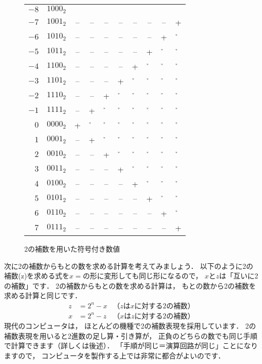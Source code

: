\begin{figure}[tb]
\begin{center}
{\small\tabcolsep=2mm\begin{tabular}{ r l c c c c c c c c }
$-8$  & $1000_2$ &  &  &  &  &  &  &  &  \\
$-7$  & $1001_2$ &--&--&--&--&--&--&--&+ \\
$-6$  & $1010_2$ &--&--&--&--&--&--&+ &\h\\
$-5$  & $1011_2$ &--&--&--&--&--&+ &\h&\h\\
$-4$  & $1100_2$ &--&--&--&--&+ &\h&\h&\h\\
$-3$  & $1101_2$ &--&--&--&+ &\h&\h&\h&\h\\
$-2$  & $1110_2$ &--&--&+ &\h&\h&\h&\h&\h\\
$-1$  & $1111_2$ &--&+ &\h&\h&\h&\h&\h&\h\\
$ 0$  & $0000_2$ &+ &\h&\h&\h&\h&\h&\h&\h\\
$ 1$  & $0001_2$ &--&+ &\h&\h&\h&\h&\h&\h\\
$ 2$  & $0010_2$ &--&--&+ &\h&\h&\h&\h&\h\\
$ 3$  & $0011_2$ &--&--&--&+ &\h&\h&\h&\h\\
$ 4$  & $0100_2$ &--&--&--&--&+ &\h&\h&\h\\
$ 5$  & $0101_2$ &--&--&--&--&--&+ &\h&\h\\
$ 6$  & $0110_2$ &--&--&--&--&--&--&+ &\h\\
$ 7$  & $0111_2$ &--&--&--&--&--&--&--&+ \\
\end{tabular}}
\caption{2の補数を用いた符号付き数値}
\label{fig:chap2:2sc}
\end{center}
\end{figure}

次に2の補数からもとの数を求める計算を考えてみましょう．
以下のように2の補数(z)を求める式を$x=$の形に変形しても同じ形になるので，
$x$と$z$は「互いに2の補数」です．
2の補数からもとの数を求める計算は，
もとの数から2の補数を求める計算と同じです．
{\small\begin{align*}
z &= 2^n - x &（zはxに対する2の補数） \\
x &= 2^n - z &（xはzに対する2の補数）
\end{align*}}
現代のコンピュータは，
ほとんどの機種で2の補数表現を採用しています．
2の補数表現を用いると2進数の足し算・引き算が，
正負のどちらの数でも同じ手順で計算できます（詳しくは後述）．
「手順が同じ＝演算回路が同じ」ことになりますので，
コンピュータを製作する上では非常に都合がよいのです．

